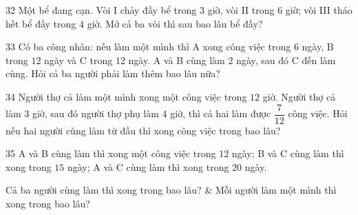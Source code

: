 \gap
\begin{probbox}{32}{}
Một bể đang cạn. Vòi I chảy đầy bể trong $3$ giờ, vòi II trong $6$ giờ; vòi III tháo hết bể đầy trong $4$ giờ. Mở cả ba vòi thì sau bao lâu bể đầy?
\end{probbox}
\gap
\begin{probbox}{33}{}
Có ba công nhân: nếu làm một mình thì A xong công việc trong $6$ ngày, B trong $12$ ngày và C trong $12$ ngày. A và B cùng làm $2$ ngày, sau đó C đến làm cùng. Hỏi cả ba người phải làm thêm bao lâu nữa?
\end{probbox}
\gap
\begin{probbox}{34}{}
Người thợ cả làm một mình xong một công việc trong $12$ giờ. Người thợ cả làm $3$ giờ, sau đó người thợ phụ làm $4$ giờ, thì cả hai làm được $\dfrac7{12}$ công việc. Hỏi nếu hai người cùng làm từ đầu thì xong công việc trong bao lâu?
\end{probbox}
\gap
\begin{probbox}{35}{}
A và B cùng làm thì xong một công việc trong $12$ ngày; B và C cùng làm thì xong trong $15$ ngày; A và C cùng làm thì xong trong $20$ ngày.
\begin{cols2}
 Cả ba người cùng làm thì xong trong bao lâu? &  Mỗi người làm một mình thì xong trong bao lâu?
\end{cols2}
\end{probbox}
